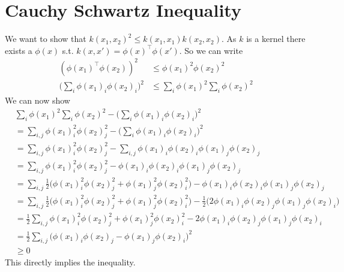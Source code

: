 
\section*{Cauchy Schwartz Inequality} %
\label{sec:cauchy_schwartz_inequality}

We want to show that $k(x_1,x_2)^2 \leq k(x_1,x_1)k(x_2,x_2)$. As $k$ is a kernel there exists a $\phi(x)$ s.t. $k(x,x') = \phi(x)^{\top}\phi(x')$. So we can write
\begin{align}
	(\phi(x_1)^{\top}\phi(x_2))^2 &\leq \phi(x_1)^2\phi(x_2)^2 \\
	\bigg(\sum_i \phi(x_1)_i \phi(x_2)_i\bigg)^2 &\leq \sum_i \phi(x_1)^2 \sum_i \phi(x_2)^2
\end{align}
We can now show
\begin{align}
 &	\sum_i \phi(x_1)^2 \sum_i \phi(x_2)^2 - \bigg(\sum_i \phi(x_1)_i \phi(x_2)_i\bigg)^2\\ &= \sum_{i,j} \phi(x_1)_i^2 \phi(x_2)_j^2 -  \bigg(\sum_i \phi(x_1)_i \phi(x_2)_i\bigg)^2 \\
	&= \sum_{i,j} \phi(x_1)_i^2 \phi(x_2)_j^2 -  \sum_{i,j} \phi(x_1)_i \phi(x_2)_i \phi(x_1)_j \phi(x_2)_j \\
	&= \sum_{i,j} \phi(x_1)_i^2 \phi(x_2)_j^2 - \phi(x_1)_i \phi(x_2)_i \phi(x_1)_j \phi(x_2)_j \\
	&= \sum_{i,j} \frac{1}{2}\bigg(\phi(x_1)_i^2 \phi(x_2)_j^2 + \phi(x_1)_j^2 \phi(x_2)_i^2 \bigg) - \phi(x_1)_i \phi(x_2)_i \phi(x_1)_j \phi(x_2)_j \\
	&= \sum_{i,j} \frac{1}{2}\bigg(\phi(x_1)_i^2 \phi(x_2)_j^2 + \phi(x_1)_j^2 \phi(x_2)_i^2 \bigg) - \frac{1}{2}\bigg(2\phi(x_1)_i \phi(x_2)_j \phi(x_1)_j \phi(x_2)_i \bigg)\\
	&= \frac{1}{2}\sum_{i,j} \phi(x_1)_i^2 \phi(x_2)_j^2 + \phi(x_1)_j^2 \phi(x_2)_i^2  - 2\phi(x_1)_i \phi(x_2)_j \phi(x_1)_j \phi(x_2)_i \\
	&= \frac{1}{2} \sum_{i,j} \bigg(\phi(x_1)_i \phi(x_2)_j - \phi(x_1)_j \phi(x_2)_i\bigg)^2\\
	&\geq 0
\end{align}
This directly implies the inequality.

